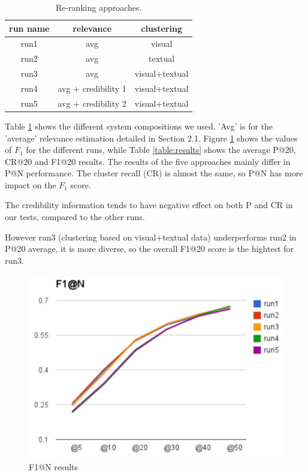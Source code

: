 \documentclass{acm_proc_article-me}
\begin{document}
\begin{table}[t]
\centering
\caption{Re-ranking approaches.}
\begin{tabular}{|c|c|c|}
	\hline 
	run name & relevance & clustering\tabularnewline
	\hline 
	\hline 
	run1 & avg & visual\tabularnewline
	\hline 
	run2 & avg & textual\tabularnewline
	\hline 
	run3 & avg & visual+textual\tabularnewline
	\hline 
	run4 & avg + credibility 1 & visual+textual\tabularnewline
	\hline 
	run5 & avg + credibility 2 & visual+textual\tabularnewline
	\hline 
\end{tabular}
\label{table:runs}
\end{table}

Table \ref{table:runs} shows the different system compositions we used. 'Avg' is for the 'average' relevance estimation detailed in Section 2.1.
Figure \ref{fig:p} shows the values of $F_1$ for the different runs, while Table \ref{table:results} shows the average P@20, CR@20 and F1@20 results. The results of the five approaches mainly differ in P@N performance. The cluster recall (CR) is almost the same, so P@N has more impact on the $F_1$ score.


The credibility information tends to have negative effect on both P and CR in our tests, compared to the other runs.

However run3 (clustering based on visual+textual data) underperforms run2 in P@20 average, it is more diverse, so the overall F1@20 score is the hightest for run3.

\begin{figure}[t]
\centering
\includegraphics[width=0.95\linewidth]{f1}
\caption{F1@N results}
\label{fig:p}
\end{figure}
\end{document}
